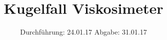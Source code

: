 

\subject{V207}
\title{Kugelfall Viskosimeter}
\date{
  Durchführung: 24.01.17
  \hspace{3em}
  Abgabe: 31.01.17
}



\maketitle
\thispagestyle{empty}
\tableofcontents
\newpage






\printbibliography


